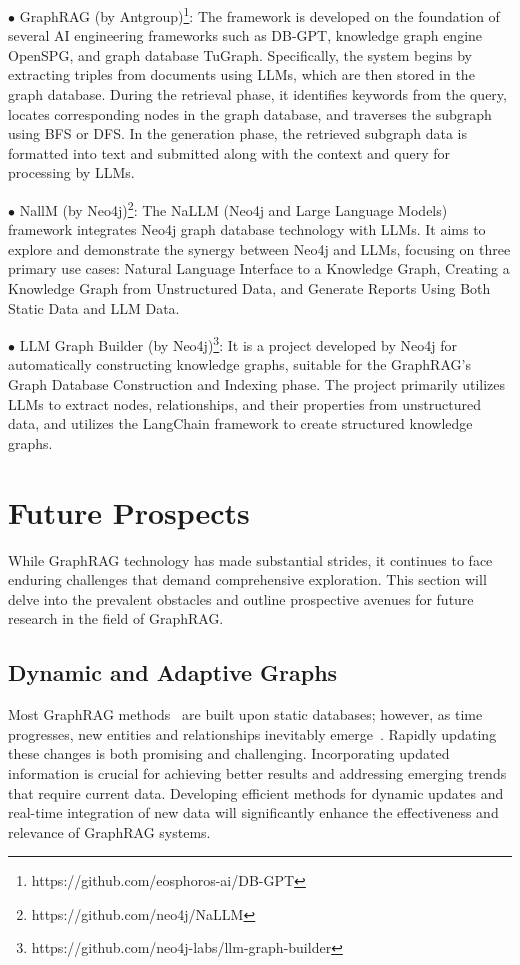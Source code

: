 \documentclass[acmsmall]{acmart}
\begin{document}
$\bullet$ GraphRAG (by Antgroup)\footnote{https://github.com/eosphoros-ai/DB-GPT}: The framework is developed on the foundation of several AI engineering frameworks such as DB-GPT, knowledge graph engine OpenSPG, and graph database TuGraph. Specifically, the system begins by extracting triples from documents using LLMs, which are then stored in the graph database. During the retrieval phase, it identifies keywords from the query, locates corresponding nodes in the graph database, and traverses the subgraph using BFS or DFS. In the generation phase, the retrieved subgraph data is formatted into text and submitted along with the context and query for processing by LLMs.

$\bullet$ NallM (by Neo4j)\footnote{https://github.com/neo4j/NaLLM}: The NaLLM (Neo4j and Large Language Models) framework integrates Neo4j graph database technology with LLMs. It aims to explore and demonstrate the synergy between Neo4j and LLMs, focusing on three primary use cases: Natural Language Interface to a Knowledge Graph, Creating a Knowledge Graph from Unstructured Data, and Generate Reports Using Both Static Data and LLM Data.

$\bullet$ LLM Graph Builder (by Neo4j)\footnote{https://github.com/neo4j-labs/llm-graph-builder}: It is a project developed by Neo4j for automatically constructing knowledge graphs, suitable for the GraphRAG's Graph Database Construction and Indexing phase. The project primarily utilizes LLMs to extract nodes, relationships, and their properties from unstructured data, and utilizes the LangChain framework to create structured knowledge graphs.

\section{Future Prospects}
\label{sec:future}
While GraphRAG technology has made substantial strides, it continues to face enduring challenges that demand comprehensive exploration. This section will delve into the prevalent obstacles and outline prospective avenues for future research in the field of GraphRAG.

\subsection{Dynamic and Adaptive Graphs}
Most GraphRAG methods~\cite{ref:graphrag,ref:kbqasurvey1,ref:kbqasurvey2,ref:kbqasurvey3,ref:kbqasurvey4,ref:chatkbqa} are built upon static databases; however, as time progresses, new entities and relationships inevitably emerge~\cite{ref:rag4dyg,ref:temple-mqa,ref:gentkgqa}. Rapidly updating these changes is both promising and challenging. Incorporating updated information is crucial for achieving better results and addressing emerging trends that require current data. Developing efficient methods for dynamic updates and real-time integration of new data will significantly enhance the effectiveness and relevance of GraphRAG systems.
\end{document}
